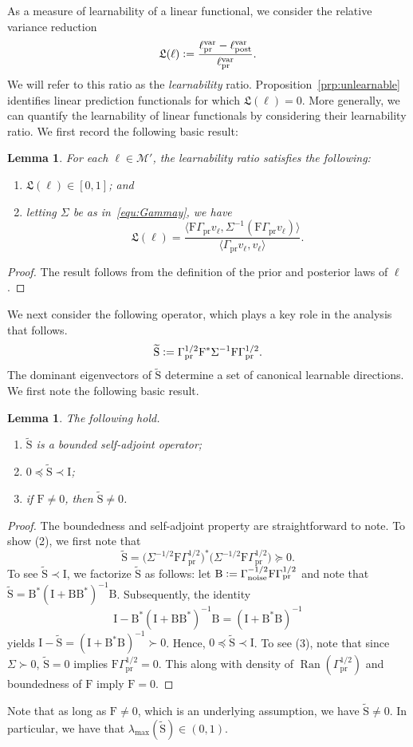 \documentclass[ba]{imsart}
\theoremstyle{plain}
\newtheorem{lemma}[theorem]{Lemma}
\newcommand{\defeq}{\vcentcolon=}
\newcommand{\prcov}{\Gamma_{\mathrm{pr}}}
\newcommand{\noise}{\Gamma_{\mathrm{noise}}}
\newcommand{\B}{\mathrm{B}}
\newcommand{\F}{\mathrm{F}}
\newcommand{\I}{\mathrm{I}}
\newcommand{\St}{\widetilde{\mathrm{S}}}
\newcommand{\ip}[2]{\langle {#1}, {#2}\rangle}
\newcommand{\lprsig}{\ell_\text{pr}^\text{var}}
\newcommand{\lpostsig}{\ell_\text{post}^\text{var}}
\newcommand{\Gammay}{\Sigma}
\newcommand{\M}{\mathcal{M}}
\newcommand{\LL}{\mathfrak{L}}
\begin{document}
As a measure of learnability of a linear functional, we consider 
the relative variance reduction
\[
    \LL(\ell)
    \defeq
    \frac{\lprsig-\lpostsig}{\lprsig}.
\]
We will refer to this ratio as the \emph{learnability} ratio.
Proposition~\ref{prp:unlearnable} identifies linear 
prediction functionals for which $\LL(\ell) = 0$. 
More generally, we can quantify the learnability of 
linear functionals by considering their learnability ratio. 
We first record the following basic result: 
\begin{lemma}
For each $\ell \in \M'$,
the learnability ratio satisfies the following:
\begin{enumerate}
\item $\LL(\ell) \in [0, 1]$; and 
\item 
letting $\Gammay$ be as in~\eqref{equ:Gammay},
we have 
\begin{equation}\label{equ:LL}
\LL(\ell) =  
\frac{\ip{\F\prcov v_\ell}{\Gammay^{-1} (\F\prcov v_\ell)}}{\ip{\prcov v_\ell}{v_\ell}}. 
\end{equation}
\end{enumerate}
\end{lemma}
\begin{proof}
The result follows from the definition of the prior and posterior laws of 
$\ell$.
\end{proof}

We next consider the following operator, which plays a key role in the analysis that follows.
\begin{equation}\label{equ:St}
    \St \defeq \prcov^{1/2}\F^*\Gammay^{-1}\F\prcov^{1/2}.
\end{equation} 
The dominant eigenvectors of $\St$ determine a set of canonical learnable directions.
We first note the following basic result.
\begin{lemma}\label{lem:S-spectrum}
The following hold.
\begin{enumerate}
\item $\St$ is a bounded self-adjoint operator;
\item  $0\preceq \St \prec \I$;
\item  if $\F \neq 0$, then $\St \neq 0$.
\end{enumerate}
\end{lemma}
\begin{proof}
The boundedness and self-adjoint property are straightforward to note.
To show (2), we first note 
that 
\[
\St
=
\bigl(\Gammay^{-1/2}\F\prcov^{1/2}\bigr)^*
\bigl(\Gammay^{-1/2}\F\prcov^{1/2}\bigr)
\succeq 0.
\]
To see $\St \prec \I$, we factorize $\St$ as follows: 
let
$\B\defeq \noise^{-1/2}\F\prcov^{1/2}$ and note that
$\St = \B^*(\I+\B\B^*)^{-1}\B$.
Subsequently, the identity
\[
    \I-\B^*(\I+\B\B^*)^{-1}\B
    =
    (\I+\B^*\B)^{-1}
\]
yields
$\I-\St=(\I+\B^*\B)^{-1}\succ0$.
Hence, $0\preceq\St\prec \I$. 
To see (3), note that since 
$\Gammay \succ 0$, $\St = 0$ implies $\F\prcov^{1/2} = 0$.  
This along with 
density of $\operatorname{Ran}(\prcov^{1/2})$ and boundedness of $\F$ imply
$\F=0$. 
\end{proof}
Note that as long as $\F \neq 0$, which is an underlying assumption, we have $\St\neq0$. 
In particular, we have that $\lambda_{\max}(\St) \in (0, 1)$. 
\end{document}
